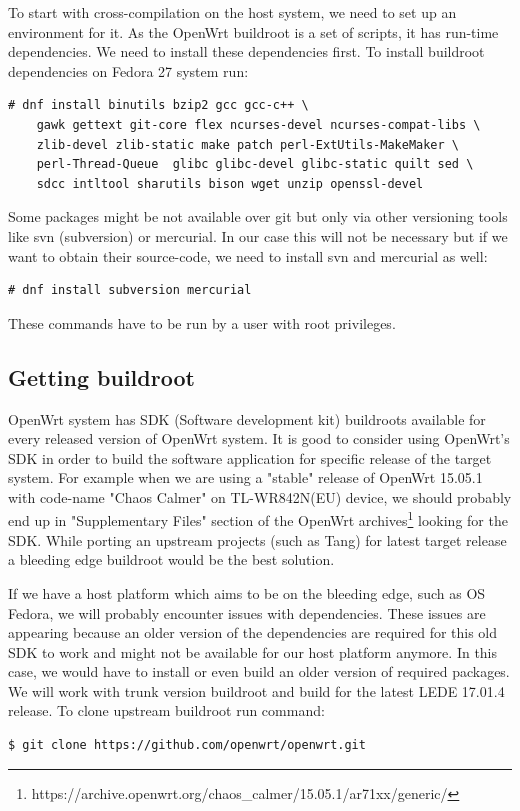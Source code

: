 To start with cross-compilation on the host system, we need to set up an environment for it.
As the OpenWrt buildroot is a set of scripts, it has run-time dependencies.
We need to install these dependencies first.
To install buildroot dependencies on Fedora 27 system run:
\begin{lstlisting}[columns=fixed,basicstyle=\ttfamily\footnotesize,tabsize=4,backgroundcolor=\color{yellow!10}]
# dnf install binutils bzip2 gcc gcc-c++ \
    gawk gettext git-core flex ncurses-devel ncurses-compat-libs \
    zlib-devel zlib-static make patch perl-ExtUtils-MakeMaker \
    perl-Thread-Queue  glibc glibc-devel glibc-static quilt sed \
    sdcc intltool sharutils bison wget unzip openssl-devel
\end{lstlisting}
Some packages might be not available over git but only via other versioning tools like svn (subversion) or mercurial.
In our case this will not be necessary but if we want to obtain their source-code, we need to install svn and mercurial as well:
\begin{lstlisting}[columns=fixed,basicstyle=\ttfamily\footnotesize,tabsize=4,backgroundcolor=\color{yellow!10}]
# dnf install subversion mercurial
\end{lstlisting}
These commands have to be run by a user with root privileges.



\subsection{Getting buildroot}

OpenWrt system has SDK (Software development kit) buildroots available for every released version of OpenWrt system.
It is good to consider using OpenWrt's SDK in order to build the software application for specific release of the target system.
For example when we are using a "stable" release of OpenWrt 15.05.1 with code-name "Chaos Calmer" on TL-WR842N(EU) device, we should probably end up in "Supplementary Files" section of the OpenWrt archives\footnote{https://archive.openwrt.org/chaos\_calmer/15.05.1/ar71xx/generic/} looking for the SDK.
While porting an upstream projects (such as Tang) for latest target release a bleeding edge buildroot would be the best solution.

If we have a host platform which aims to be on the bleeding edge, such as OS Fedora, we will probably encounter issues with dependencies.
These issues are appearing because an older version of the dependencies are required for this old SDK to work and might not be available for our host platform anymore.
In this case, we would have to install or even build an older version of required packages.
We will work with trunk version buildroot and build for the latest LEDE 17.01.4 release.
To clone upstream buildroot run command:
\begin{lstlisting}[columns=fixed,basicstyle=\ttfamily\footnotesize,tabsize=4,backgroundcolor=\color{yellow!10}]
$ git clone https://github.com/openwrt/openwrt.git
\end{lstlisting}

